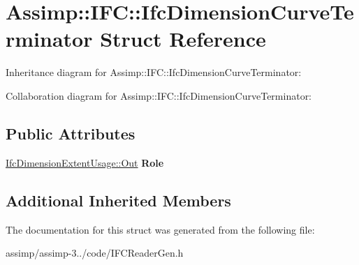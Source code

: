 \hypertarget{struct_assimp_1_1_i_f_c_1_1_ifc_dimension_curve_terminator}{\section{Assimp\+:\+:I\+F\+C\+:\+:Ifc\+Dimension\+Curve\+Terminator Struct Reference}
\label{struct_assimp_1_1_i_f_c_1_1_ifc_dimension_curve_terminator}
}


Inheritance diagram for Assimp\+:\+:I\+F\+C\+:\+:Ifc\+Dimension\+Curve\+Terminator\+:


Collaboration diagram for Assimp\+:\+:I\+F\+C\+:\+:Ifc\+Dimension\+Curve\+Terminator\+:
\subsection*{Public Attributes}
\begin{DoxyCompactItemize}
\item 
\hypertarget{struct_assimp_1_1_i_f_c_1_1_ifc_dimension_curve_terminator_ad1096c99d8f197bd9b2af6ec187584fd}{\hyperlink{classboost_1_1shared__ptr}{Ifc\+Dimension\+Extent\+Usage\+::\+Out} {\bfseries Role}}\label{struct_assimp_1_1_i_f_c_1_1_ifc_dimension_curve_terminator_ad1096c99d8f197bd9b2af6ec187584fd}

\end{DoxyCompactItemize}
\subsection*{Additional Inherited Members}


The documentation for this struct was generated from the following file\+:\begin{DoxyCompactItemize}
\item 
assimp/assimp-\/3../code/I\+F\+C\+Reader\+Gen.\+h\end{DoxyCompactItemize}
